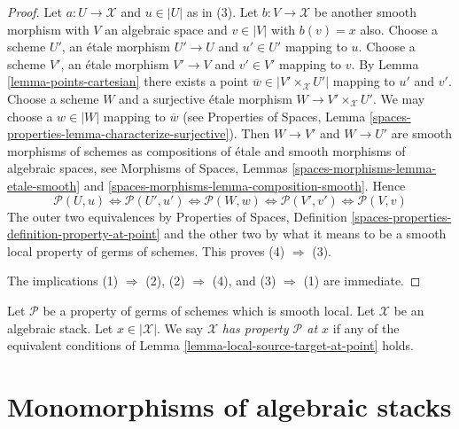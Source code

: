 \begin{proof}
Let $a : U \to \mathcal{X}$ and $u \in |U|$ as in (3). Let
$b : V \to \mathcal{X}$ be another smooth morphism with $V$ an algebraic
space and $v \in |V|$ with $b(v) = x$ also.
Choose a scheme $U'$, an \'etale morphism $U' \to U$ and $u' \in U'$
mapping to $u$. Choose a scheme $V'$, an \'etale morphism $V' \to V$
and $v' \in V'$ mapping to $v$. By
Lemma \ref{lemma-points-cartesian}
there exists a point $\overline{w} \in |V' \times_{\mathcal{X}} U'|$
mapping to $u'$ and $v'$. Choose a scheme $W$ and a surjective \'etale
morphism $W \to V' \times_{\mathcal{X}} U'$. We may choose a
$w \in |W|$ mapping to $\overline{w}$ (see
Properties of Spaces,
Lemma \ref{spaces-properties-lemma-characterize-surjective}).
Then $W \to V'$ and $W \to U'$ are smooth morphisms of schemes
as compositions of \'etale and smooth morphisms of algebraic spaces, see
Morphisms of Spaces, Lemmas \ref{spaces-morphisms-lemma-etale-smooth} and
\ref{spaces-morphisms-lemma-composition-smooth}.
Hence
$$
\mathcal{P}(U, u)
\Leftrightarrow
\mathcal{P}(U', u')
\Leftrightarrow
\mathcal{P}(W, w)
\Leftrightarrow
\mathcal{P}(V', v')
\Leftrightarrow
\mathcal{P}(V, v)
$$
The outer two equivalences by
Properties of Spaces,
Definition \ref{spaces-properties-definition-property-at-point}
and the other two by what it means to be a smooth local property
of germs of schemes. This proves (4) $\Rightarrow$ (3).

\medskip\noindent
The implications (1) $\Rightarrow$ (2), (2) $\Rightarrow$ (4),
and (3) $\Rightarrow$ (1) are immediate.
\end{proof}

\begin{definition}
\label{definition-property-at-point}
Let $\mathcal{P}$ be a property of germs of schemes which is 
smooth local. Let $\mathcal{X}$ be an algebraic stack.
Let $x \in |\mathcal{X}|$.
We say $\mathcal{X}$ {\it has property $\mathcal{P}$ at $x$}
if any of the equivalent conditions of
Lemma \ref{lemma-local-source-target-at-point}
holds.
\end{definition}










\section{Monomorphisms of algebraic stacks}
\label{section-monomorphisms}

